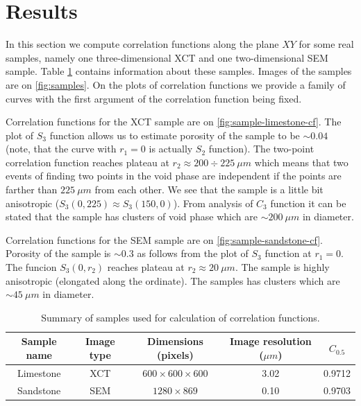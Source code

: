 \documentclass[1p]{elsarticle}
\begin{document}
\section{Results}
In this section we compute correlation functions along the plane $XY$ for some
real samples, namely one three-dimensional XCT and one two-dimensional SEM
sample. Table \ref{tab:summary} contains information about these samples. Images
of the samples are on \cref{fig:samples}. On the plots of correlation functions
we provide a family of curves with the first argument of the correlation
function being fixed.

Correlation functions for the XCT sample are on
\cref{fig:sample-limestone-cf}. The plot of $S_3$ function allows us to estimate
porosity of the sample to be $\sim 0.04$ (note, that the curve with $r_1 = 0$ is
actually $S_2$ function). The two-point correlation function reaches plateau at
$r_2 \approx 200\div 225\ \mu m$ which means that two events of finding two
points in the void phase are independent if the points are farther than
$225\ \mu m$ from each other. We see that the sample is a little bit anisotropic
($S_3(0, 225) \approx S_3(150, 0)$). From analysis of $C_3$ function it can be
stated that the sample has clusters of void phase which are $\sim 200\ \mu m$ in
diameter.

Correlation functions for the SEM sample are on
\cref{fig:sample-sandstone-cf}. Porosity of the sample is $\sim 0.3$ as follows
from the plot of $S_3$ function at $r_1 = 0$. The funcion $S_3(0, r_2)$ reaches
plateau at $r_2 \approx 20\ \mu m$. The sample is highly anisotropic (elongated
along the ordinate). The samples has clusters which are $\sim 45\ \mu m$ in
diameter.
\begin{table}[!htp]
  \centering
  \begin{tabular}{|c|c|c|c|c|}
    \hline
    Sample name & Image type & Dimensions (pixels) & Image resolution ($\mu m$) & $C_{0.5}$\\
    \hline
    Limestone & XCT &  $600 \times 600 \times 600$ & 3.02 & 0.9712 \\
    Sandstone & SEM &  $1280 \times 869$ & 0.10 & 0.9703 \\
    \hline
  \end{tabular}
  \caption{Summary of samples used for calculation of correlation functions.}
  \label{tab:summary}
\end{table}
\end{document}
